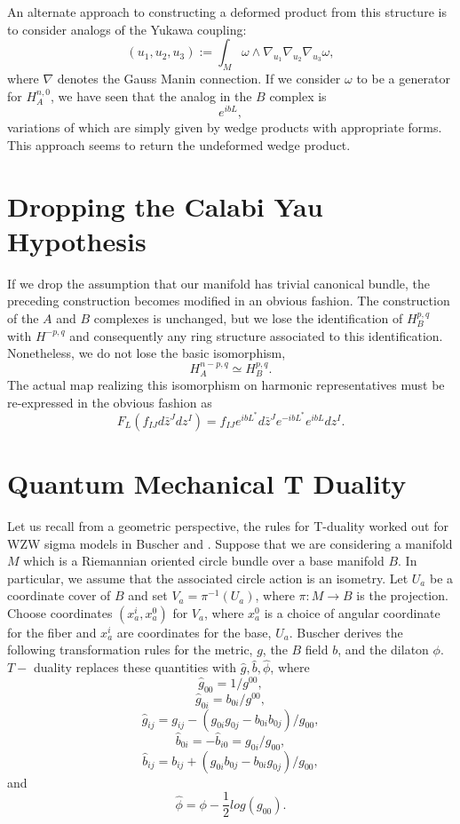\documentclass[a4paper,11pt]{amsart}
\begin{document}
An alternate approach to constructing a deformed product from this structure is
to consider analogs of the Yukawa coupling:
$$(u_1,u_2,u_3):=
\int_M\omega\wedge\nabla_{u_1}\nabla_{u_2}\nabla_{u_3}\omega,$$
where $\nabla$ denotes the Gauss Manin connection. 
If we consider $\omega$ to be a generator for $H_A^{n,0}$, we have seen that 
the analog in the $B$ complex is 
$$e^{ibL},$$ 
variations of which are simply given by wedge products with appropriate forms. 
This approach seems to return the undeformed wedge product. 

\section{Dropping the Calabi Yau Hypothesis}
If we drop the assumption that our manifold has trivial canonical bundle, the
preceding construction becomes modified in an obvious fashion. The construction
of the $A$ and $B$ complexes is unchanged, but we lose the identification of 
$H_B^{p,q}$ with $H^{-p,q}$ and consequently any ring structure associated to 
this identification. Nonetheless, we do not lose the basic isomorphism, 
$$H^{n-p,q}_A \simeq H^{p,q}_B.$$ The actual map realizing this isomorphism on 
harmonic representatives must be re-expressed in the obvious fashion as 
$$F_L(f_{IJ}d\bar z^J dz^I) = f_{IJ}e^{ibL^*}d\bar z^J e^{-ibL^*} e^{ibL}dz^I.$$

\section{Quantum Mechanical T Duality}\label{QMT}
Let us recall from a geometric perspective, the rules for 
T-duality worked out for WZW sigma models in Buscher \cite{B1} and
\cite{B2}.  
Suppose that we are considering a manifold $M$ which is a Riemannian 
oriented circle bundle over a base manifold $B$. In particular, we assume 
that the associated circle action is an isometry. Let $U_a$ be a coordinate
cover of $B$ and set $V_a = \pi^{-1}(U_a)$, where $\pi:M\rightarrow B$ is the
 projection. Choose coordinates $(x_a^i,x_a^0)$ for $V_a$, where $x_a^0$ 
 is a choice of angular coordinate for the fiber and $x_a^i$ are coordinates
  for the base, $U_a$. Buscher derives the following
transformation rules for the metric, $g$, the $B$ field $b$, and the
dilaton $\phi$. $T-$ duality replaces these quantities with 
$\hat g,\hat b,\hat \phi$, where
$$\hat g_{00} = 1/g^{00},$$
$$\hat g_{0i} = b_{0i}/g^{00},$$ 
$$\hat g_{ij} = g_{ij} - (g_{0i}g_{0j} - b_{0i}b_{0j})/g_{00},$$
$$\hat b_{0i} = -\hat b_{i0} = g_{0i}/g_{00},$$
$$\hat b_{ij} = b_{ij} + (g_{0i}b_{0j} - b_{0i}g_{0j})/g_{00},$$
and
$$\hat \phi = \phi - \frac{1}{2} log(g_{00}).$$
\end{document}
